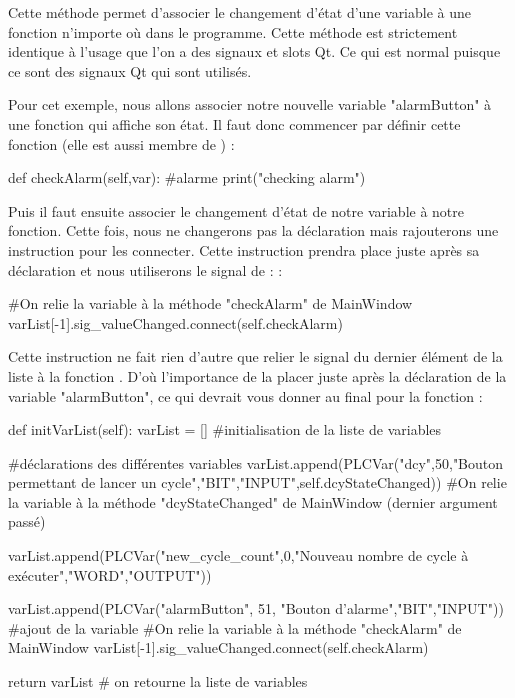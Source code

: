  Cette méthode permet d'associer le changement d'état d'une variable à une fonction n'importe où dans le programme.
\newline
Cette méthode est strictement identique à l'usage que l'on a des signaux et slots Qt. Ce qui est normal puisque ce sont des signaux Qt qui sont utilisés.
\smallSkip
\textcolor{red}{}  \textcolor{red}{}
\smallSkip

Pour cet exemple, nous allons associer notre nouvelle variable "alarmButton" à une fonction qui affiche son état.\newline
Il faut donc commencer par définir cette fonction (elle est aussi membre de ) :
\begin{pyCode}
def checkAlarm(self,var):
		#alarme
		print("checking alarm")
\end{pyCode}
\smallSkip

Puis il faut ensuite associer le changement d'état de notre variable à notre fonction. Cette fois, nous ne changerons pas la déclaration mais rajouterons une instruction pour les connecter.\newline
Cette instruction prendra place juste après sa déclaration et nous utiliserons le signal de  :  :
\begin{pyCode}
#On relie la variable à la méthode "checkAlarm" de MainWindow
varList[-1].sig_valueChanged.connect(self.checkAlarm)
\end{pyCode}
Cette instruction ne fait rien d'autre que relier le signal  du dernier élément de la liste  à la fonction .\newline
D'où l'importance de la placer juste après la déclaration de la variable "alarmButton", ce qui devrait vous donner au final pour la fonction  :

\begin{pyCode}
def initVarList(self):
	varList = []  #initialisation de la liste de variables


	#déclarations des différentes variables
	varList.append(PLCVar("dcy",50,"Bouton permettant de lancer un cycle","BIT","INPUT",self.dcyStateChanged))
	#On relie la variable à la méthode "dcyStateChanged" de MainWindow (dernier argument passé)

	varList.append(PLCVar("new_cycle_count",0,"Nouveau nombre de cycle à exécuter","WORD","OUTPUT"))

	varList.append(PLCVar("alarmButton", 51, "Bouton d'alarme","BIT","INPUT")) #ajout de la variable
	#On relie la variable à la méthode "checkAlarm" de MainWindow
	varList[-1].sig_valueChanged.connect(self.checkAlarm)

	return varList  # on retourne la liste de variables
\end{pyCode}


